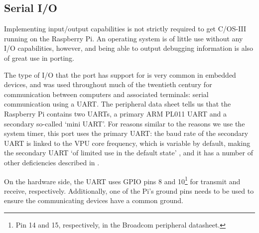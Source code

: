 \documentclass[twoside]{uva-inf-bachelor-thesis}
\newcommand{\ucosiii}{\textmu C/OS-III\xspace}
\begin{document}
\subsection{Serial I/O} \label{sec:miniuart}
Implementing input/output capabilities is not strictly required to get \ucosiii running on the Raspberry Pi. An operating system is of little use without any I/O capabilities, however, and being able to output debugging information is also of great use in porting.

The type of I/O that the port has support for is very common in embedded devices, and was used throughout much of the twentieth century for communication between computers and associated terminals: serial communication using a UART. The peripheral data sheet tells us that the Raspberry Pi contains two UARTs, a primary ARM PL011 UART and a secondary so-called `mini UART'. For reasons similar to the reasons we use the system timer, this port uses the primary UART: the baud rate of the secondary UART is linked to the VPU core frequency, which is variable by default, making the secondary UART `of limited use in the default state' \cite{rpi:uart}, and it has a number of other deficiencies described in \cite{bcm:2835peripherals}.

On the hardware side, the UART uses GPIO pins 8 and 10\footnote{Pin 14 and 15, respectively, in the Broadcom peripheral datasheet.} for transmit and receive, respectively. Additionally, one of the Pi's ground pins needs to be used to ensure the communicating devices have a common ground.



%
%
%
%
\end{document}
